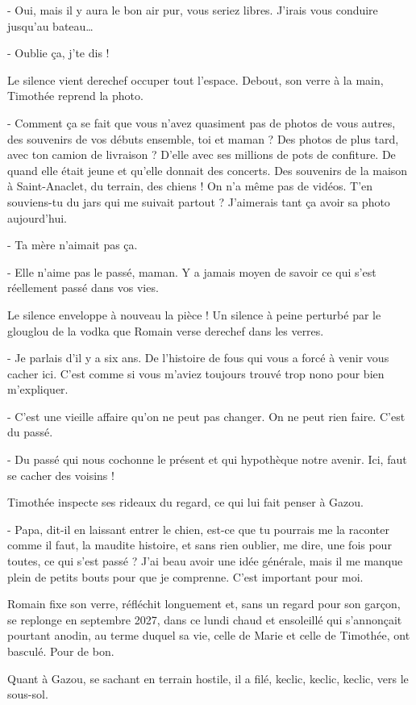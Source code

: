 - Oui, mais il y aura le bon air pur, vous seriez libres. J’irais vous conduire jusqu’au bateau…

- Oublie ça, j’te dis !

Le silence vient derechef occuper tout l’espace. Debout, son verre à la main, Timothée reprend la photo.

- Comment ça se fait que vous n’avez quasiment pas de photos de vous autres, des souvenirs de vos débuts ensemble, toi et maman ? Des photos de plus tard, avec ton camion de livraison ? D’elle avec ses millions de pots de confiture. De quand elle était jeune et qu’elle donnait des concerts. Des souvenirs de la maison à Saint-Anaclet, du terrain, des chiens ! On n’a même pas de vidéos. T’en souviens-tu du jars qui me suivait partout ? J’aimerais tant ça avoir sa photo aujourd’hui.

- Ta mère n’aimait pas ça.

- Elle n’aime pas le passé, maman. Y a jamais moyen de savoir ce qui s’est réellement passé dans vos vies.

Le silence enveloppe à nouveau la pièce ! Un silence à peine perturbé par le glouglou de la vodka que Romain verse derechef dans les verres.

- Je parlais d’il y a six ans. De l’histoire de fous qui vous a forcé à venir vous cacher ici. C’est comme si vous m’aviez toujours trouvé trop nono pour bien m’expliquer.

- C’est une vieille affaire qu’on ne peut pas changer. On ne peut rien faire. C’est du passé.

- Du passé qui nous cochonne le présent et qui hypothèque notre avenir. Ici, faut se cacher des voisins !

Timothée inspecte ses rideaux du regard, ce qui lui fait penser à Gazou.

- Papa, dit-il en laissant entrer le chien, est-ce que tu pourrais me la raconter comme il faut, la maudite histoire, et sans rien oublier, me dire, une fois pour toutes, ce qui s’est passé ? J’ai beau avoir une idée générale, mais il me manque plein de petits bouts pour que je comprenne. C’est important pour moi.

Romain fixe son verre, réfléchit longuement et, sans un regard pour son garçon, se replonge en septembre 2027, dans ce lundi chaud et ensoleillé qui s’annonçait pourtant anodin, au terme duquel sa vie, celle de Marie et celle de Timothée, ont basculé. Pour de bon.

Quant à Gazou, se sachant en terrain hostile, il a filé, keclic, keclic, keclic, vers le sous-sol.

